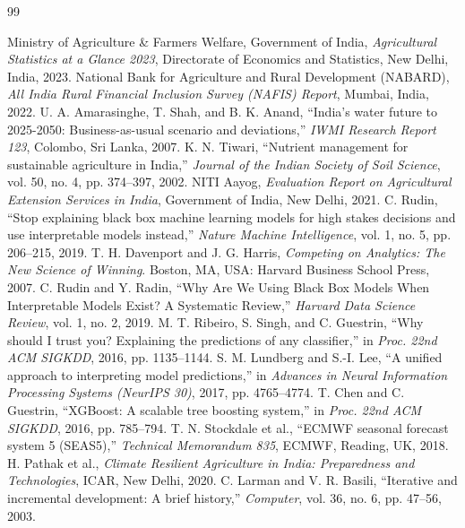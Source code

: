 \documentclass[11pt,a4paper]{report}
\begin{document}
\begin{thebibliography}{99}

 Ministry of Agriculture \& Farmers Welfare, Government of India, \emph{Agricultural Statistics at a Glance 2023}, Directorate of Economics and Statistics, New Delhi, India, 2023.
 National Bank for Agriculture and Rural Development (NABARD), \emph{All India Rural Financial Inclusion Survey (NAFIS) Report}, Mumbai, India, 2022.
 U. A. Amarasinghe, T. Shah, and B. K. Anand, ``India's water future to 2025-2050: Business-as-usual scenario and deviations,'' \emph{IWMI Research Report 123}, Colombo, Sri Lanka, 2007.
 K. N. Tiwari, ``Nutrient management for sustainable agriculture in India,'' \emph{Journal of the Indian Society of Soil Science}, vol. 50, no. 4, pp. 374--397, 2002.
 NITI Aayog, \emph{Evaluation Report on Agricultural Extension Services in India}, Government of India, New Delhi, 2021.
 C. Rudin, ``Stop explaining black box machine learning models for high stakes decisions and use interpretable models instead,'' \emph{Nature Machine Intelligence}, vol. 1, no. 5, pp. 206--215, 2019.
 T. H. Davenport and J. G. Harris, \emph{Competing on Analytics: The New Science of Winning}. Boston, MA, USA: Harvard Business School Press, 2007.
 C. Rudin and Y. Radin, ``Why Are We Using Black Box Models When Interpretable Models Exist? A Systematic Review,'' \emph{Harvard Data Science Review}, vol. 1, no. 2, 2019.
 M. T. Ribeiro, S. Singh, and C. Guestrin, ``Why should I trust you? Explaining the predictions of any classifier,'' in \emph{Proc. 22nd ACM SIGKDD}, 2016, pp. 1135--1144.
 S. M. Lundberg and S.-I. Lee, ``A unified approach to interpreting model predictions,'' in \emph{Advances in Neural Information Processing Systems (NeurIPS 30)}, 2017, pp. 4765--4774.
 T. Chen and C. Guestrin, ``XGBoost: A scalable tree boosting system,'' in \emph{Proc. 22nd ACM SIGKDD}, 2016, pp. 785--794.
 T. N. Stockdale et al., ``ECMWF seasonal forecast system 5 (SEAS5),'' \emph{Technical Memorandum 835}, ECMWF, Reading, UK, 2018.
 H. Pathak et al., \emph{Climate Resilient Agriculture in India: Preparedness and Technologies}, ICAR, New Delhi, 2020.
 C. Larman and V. R. Basili, ``Iterative and incremental development: A brief history,'' \emph{Computer}, vol. 36, no. 6, pp. 47--56, 2003.

\end{thebibliography}
\end{document}
